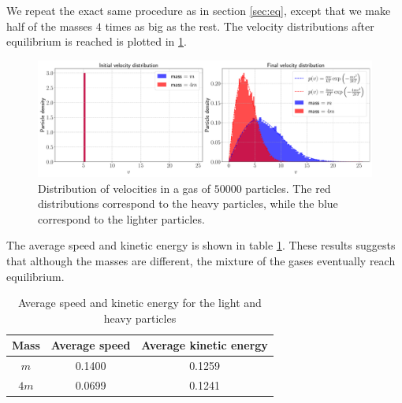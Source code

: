 We repeat the exact same procedure as in section \ref{sec:eq}, except that we make half of the masses $4$ times as big as the rest. The velocity distributions after equilibrium is reached is plotted in \ref{fig:dist_3}.

\begin{figure}[htb]
	\centering
	\includegraphics[width=\textwidth]{../fig/distribution_2}
	\caption{Distribution of velocities in a gas of $50000$ particles. The red distributions correspond to the heavy particles, while the blue correspond to the lighter particles.}
	\label{fig:dist_3}
\end{figure}

The average speed and kinetic energy is shown in table \ref{tab:averages}. These results suggests that although the masses are different, the mixture of the gases eventually reach equilibrium.  

\begin{table}[htb]
	\centering 
	\caption{Average speed and kinetic energy for the light and heavy particles}
	\begin{tabular}{ccc}
		\hline
		\textbf{Mass }& \textbf{Average speed} & \textbf{Average kinetic energy} \\
		\hline 
		$m$   & 0.1400 & 0.1259 \\
		$4m$  & 0.0699 & 0.1241 \\
		\hline 
	\end{tabular}
	\label{tab:averages}
\end{table}
